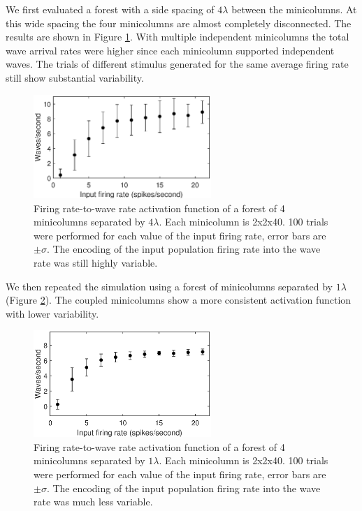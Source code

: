 We first evaluated a forest with a side spacing of $4\lambda$ between the minicolumns.
At this wide spacing the four minicolumns are almost completely disconnected.
The results are shown in Figure \ref{fig:forest_encoding_separate}.
With multiple independent minicolumns the total wave arrival rates were higher since each minicolumn supported independent waves.
The trials of different stimulus generated for the same average firing rate still show substantial variability.
\begin{figure}[!htb]
 \centering
 \includegraphics[width=0.6\textwidth]{fig/ForestEncoding_FourLambda}
 \caption{Firing rate-to-wave rate activation function of a forest of 4 minicolumns separated by $4\lambda$.
          Each minicolumn is 2x2x40.
          100 trials were performed for each value of the input firing rate, error bars are $\pm \sigma$.
          The encoding of the input population firing rate into the wave rate was still highly variable.}
 \label{fig:forest_encoding_separate}
\end{figure}
\FloatBarrier

We then repeated the simulation using a forest of minicolumns separated by $1\lambda$ (Figure \ref{fig:forest_encoding_coupled}).
The coupled minicolumns show a more consistent activation function with lower variability.

\begin{figure}[!htb]
 \centering
 \includegraphics[width=0.6\textwidth]{fig/ForestEncoding_OneLambda}
 \caption{Firing rate-to-wave rate activation function of a forest of 4 minicolumns separated by $1\lambda$.
          Each minicolumn is 2x2x40.
          100 trials were performed for each value of the input firing rate, error bars are $\pm \sigma$.
          The encoding of the input population firing rate into the wave rate was much less variable.}
 \label{fig:forest_encoding_coupled}
\end{figure}
\FloatBarrier


\endinput

